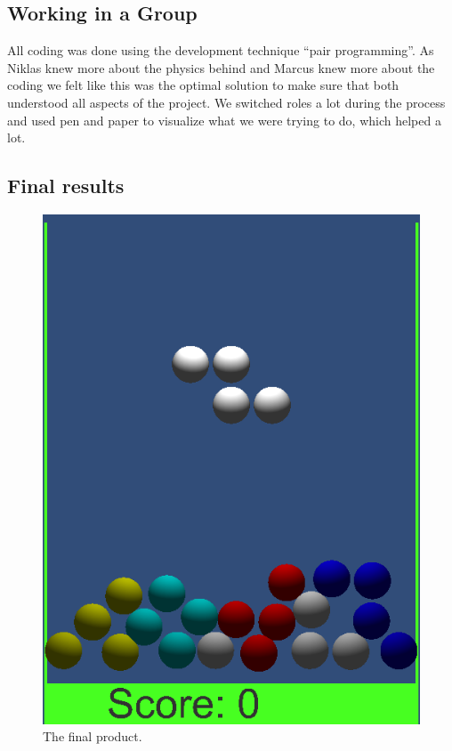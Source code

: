 \documentclass[11pt]{article} %
\begin{document}
\subsection{Working in a Group}
All coding was done using the development technique ``pair programming''. As Niklas knew more about the physics behind and Marcus knew more about the coding we felt like this was the optimal solution to make sure that both understood all aspects of the project. We switched roles a lot during the process and used pen and paper to visualize what we were trying to do, which helped a lot.

\subsection{Final results}
\begin{figure}[h!]
	\centering
	\includegraphics[scale=0.404]{bild1.png}
	\caption{The final product.}
\end{figure}
\end{document}
